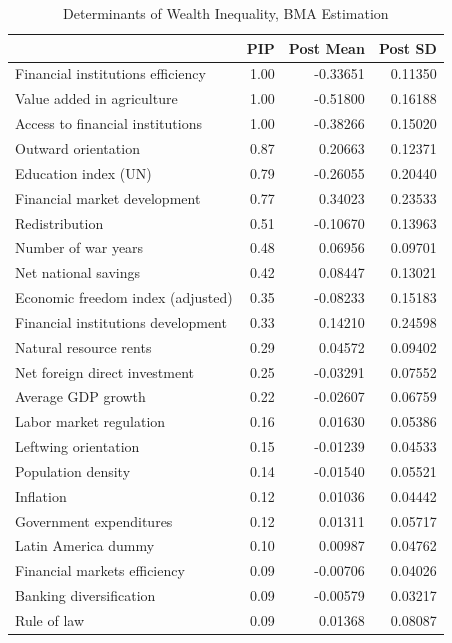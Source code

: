 \begin{refsection}
\begin{table}[!ht]
\footnotesize
\centering
\caption{Determinants of Wealth Inequality, \ac{BMA} Estimation}
\label{ch3table:res1}
\begin{threeparttable}
\begin{tabular}{lrrr}
  \toprule
 & PIP & Post Mean & Post SD \\ 
    \midrule
  Financial institutions efficiency & 1.00 & -0.33651 & 0.11350 \\ 
  Value added in agriculture & 1.00 & -0.51800 & 0.16188 \\ 
  Access to financial institutions & 1.00 & -0.38266 & 0.15020 \\ 
  Outward orientation & 0.87 & 0.20663 & 0.12371 \\ 
  Education index (UN) & 0.79 & -0.26055 & 0.20440 \\ 
  Financial market development & 0.77 & 0.34023 & 0.23533 \\ 
  Redistribution & 0.51 & -0.10670 & 0.13963 \\ 
  Number of war years & 0.48 & 0.06956 & 0.09701 \\ 
  Net national savings & 0.42 & 0.08447 & 0.13021 \\ 
  Economic freedom index (adjusted) & 0.35 & -0.08233 & 0.15183 \\ 
  Financial institutions development & 0.33 & 0.14210 & 0.24598 \\ 
  Natural resource rents & 0.29 & 0.04572 & 0.09402 \\ 
  Net foreign direct investment & 0.25 & -0.03291 & 0.07552 \\ 
  Average GDP growth & 0.22 & -0.02607 & 0.06759 \\ 
  Labor market regulation & 0.16 & 0.01630 & 0.05386 \\ 
  Leftwing orientation & 0.15 & -0.01239 & 0.04533 \\ 
  Population density & 0.14 & -0.01540 & 0.05521 \\ 
  Inflation & 0.12 & 0.01036 & 0.04442 \\ 
  Government expenditures & 0.12 & 0.01311 & 0.05717 \\ 
  Latin America dummy & 0.10 & 0.00987 & 0.04762 \\ 
  Financial markets efficiency & 0.09 & -0.00706 & 0.04026 \\ 
  Banking diversification & 0.09 & -0.00579 & 0.03217 \\ 
  Rule of law & 0.09 & 0.01368 & 0.08087 \\ 

\end{tabular}
\end{threeparttable}
\end{table}
\end{refsection}
